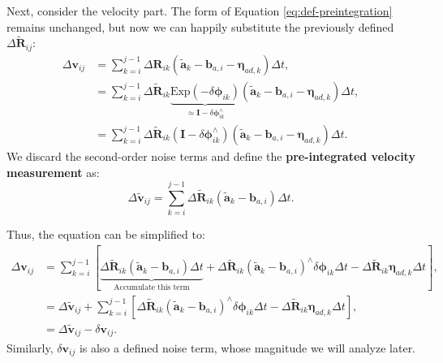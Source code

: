 Next, consider the velocity part. The form of Equation \eqref{eq:def-preintegration} remains unchanged, but now we can happily substitute the previously defined $\Delta \tilde{\mathbf{R}}_{ij}$:
\begin{equation}\label{key}
	\begin{aligned}
		\Delta \mathbf{v}_{ij} &= \sum_{k=i}^{j-1} \Delta \mathbf{R}_{ik} (\tilde{\mathbf{a}}_k - \mathbf{b}_{a,i} - 
		\boldsymbol{\eta}_{ad, k}) \Delta t, \\
		&=  \sum_{k=i}^{j-1} \Delta \tilde{\mathbf{R}}_{ik} \underbrace{\mathrm{Exp} (-\delta 
			\boldsymbol{\phi}_{ik})}_{\approx \mathbf{I} - \delta \boldsymbol{\phi}_{ik}^\wedge } 
		(\tilde{\mathbf{a}}_k - \mathbf{b}_{a,i} - \boldsymbol{\eta}_{ad, k}) \Delta t, \\
		&= \sum_{k=i}^{j-1} \Delta \tilde{\mathbf{R}}_{ik} (\mathbf{I} - \delta 
		\boldsymbol{\phi}^\wedge_{ik})(\tilde{\mathbf{a}}_k - \mathbf{b}_{a,i} - \boldsymbol{\eta}_{ad, k}) 
		\Delta t .
	\end{aligned}
\end{equation}
We discard the second-order noise terms and define the \textbf{pre-integrated velocity measurement} as:
\begin{equation}\label{key}
	\Delta \tilde{\mathbf{v}}_{ij} = \sum_{k=i}^{j-1} \Delta \tilde{\mathbf{R}}_{ik} (\tilde{\mathbf{a}}_k - \mathbf{b}_{a,i}) 
	\Delta t.
\end{equation}

Thus, the equation can be simplified to:
\begin{equation}\label{eq:def-of-delta-v}
	\begin{aligned}
		\Delta \mathbf{v}_{ij} &= \sum_{k=i}^{j-1} \left[\underbrace{\Delta \tilde{\mathbf{R}}_{ik} (\tilde{\mathbf{a}}_k - 
			\mathbf{b}_{a,i}) \Delta t}_{\text{Accumulate this term}} + \Delta \tilde{\mathbf{R}}_{ik} (\tilde{\mathbf{a}}_k - 
		\mathbf{b}_{a,i})^\wedge \delta \boldsymbol{\phi}_{ik} \Delta t - \Delta \tilde{\mathbf{R}}_{ik} 
		\boldsymbol{\eta}_{ad, k} \Delta t\right], \\
		&= \Delta \tilde{\mathbf{v}}_{ij} + \sum_{k=i}^{j-1} \left[\Delta \tilde{\mathbf{R}}_{ik} (\tilde{\mathbf{a}}_k - 
		\mathbf{b}_{a,i})^\wedge \delta \boldsymbol{\phi}_{ik} \Delta t - \Delta \tilde{\mathbf{R}}_{ik} 
		\boldsymbol{\eta}_{ad, k} \Delta t\right], \\
		&= \Delta \tilde{\mathbf{v}}_{ij} - \delta \mathbf{v}_{ij}.
	\end{aligned}
\end{equation}
Similarly, $\delta \mathbf{v}_{ij}$ is also a defined noise term, whose magnitude we will analyze later.

